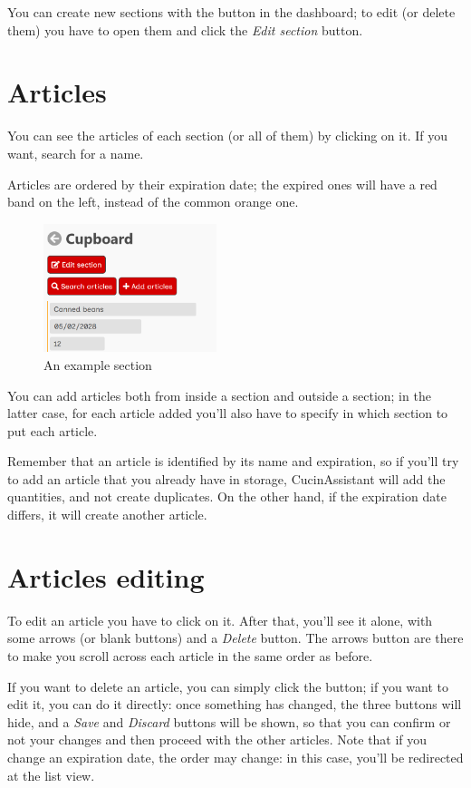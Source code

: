 \documentclass[12pt, a4paper]{report}
\begin{document}
    You can create new sections with the button in the dashboard; to edit (or delete them) you have to open them and click the \emph{Edit section}
    button.

    \section{Articles}

    You can see the articles of each section (or all of them) by clicking on it. If you want, search for a name.

    Articles are ordered by their expiration date; the expired ones will have a red band on the left, instead of the common orange one.

    \begin{figure}[H]
        \centering
        \includegraphics[width=0.45\textwidth]{assets/en/articles.png}
        \caption{An example section}
    \end{figure}

    You can add articles both from inside a section and outside a section; in the latter case, for each article added you'll also have to specify in
    which section to put each article.

    Remember that an article is identified by its name and expiration, so if you'll try to add an article that you already have in storage,
    CucinAssistant will add the quantities, and not create duplicates. On the other hand, if the expiration date differs, it will create another
    article.

    \section{Articles editing}

    To edit an article you have to click on it. After that, you'll see it alone, with some arrows (or blank buttons) and a \emph{Delete} button.
    The arrows button are there to make you scroll across each article in the same order as before.

    If you want to delete an article, you can simply click the button; if you want to edit it, you can do it directly: once something has changed,
    the three buttons will hide, and a \emph{Save} and \emph{Discard} buttons will be shown, so that you can confirm or not your changes and then
    proceed with the other articles.
    Note that if you change an expiration date, the order may change: in this case, you'll be redirected at the list view.
\end{document}
